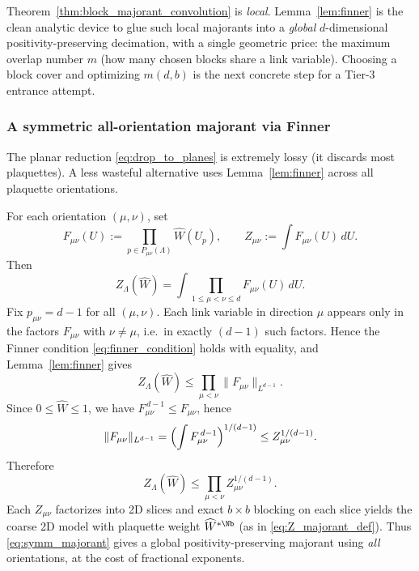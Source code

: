 \begin{remark}
Theorem~\ref{thm:block_majorant_convolution} is \emph{local}.
Lemma~\ref{lem:finner} is the clean analytic device to glue such local majorants into a \emph{global} $d$-dimensional positivity-preserving decimation, with a single geometric price: the maximum overlap number $m$ (how many chosen blocks share a link variable).
Choosing a block cover and optimizing $m(d,b)$ is the next concrete step for a Tier-3 entrance attempt.
\end{remark}

\subsubsection{A symmetric all-orientation majorant via Finner}\label{sec:symm_majorant}

The planar reduction \eqref{eq:drop_to_planes} is extremely lossy (it discards most plaquettes).
A less wasteful alternative uses Lemma~\ref{lem:finner} across all plaquette orientations.

For each orientation $(\mu,\nu)$, set
\[
F_{\mu\nu}(U):=\prod_{p\in P_{\mu\nu}(\Lambda)} \widehat W(U_p),
\qquad
Z_{\mu\nu}:=\int F_{\mu\nu}(U)\,dU.
\]
Then
\[
Z_\Lambda(\widehat W)=\int \prod_{1\le \mu<\nu\le d} F_{\mu\nu}(U)\,dU.
\]
Fix $p_{\mu\nu}=d-1$ for all $(\mu,\nu)$.
Each link variable in direction $\mu$ appears only in the factors $F_{\mu\nu}$ with $\nu\ne \mu$, i.e.\ in exactly $(d-1)$ such factors.
Hence the Finner condition \eqref{eq:finner_condition} holds with equality, and Lemma~\ref{lem:finner} gives
\begin{equation}\label{eq:symm_finner_step}
Z_\Lambda(\widehat W)\le \prod_{\mu<\nu}\|F_{\mu\nu}\|_{L^{d-1}}.
\end{equation}
Since $0\le \widehat W\le 1$, we have $F_{\mu\nu}^{\,d-1}\le F_{\mu\nu}$, hence
\[
\|F_{\mu\nu}\|_{L^{d-1}}
=\Bigl(\int F_{\mu\nu}^{\,d-1}\Bigr)^{1/(d-1)}
\le Z_{\mu\nu}^{1/(d-1)}.
\]
Therefore
\begin{equation}\label{eq:symm_majorant}
Z_\Lambda(\widehat W)
\le
\prod_{\mu<\nu} Z_{\mu\nu}^{1/(d-1)}.
\end{equation}
Each $Z_{\mu\nu}$ factorizes into 2D slices and exact $b\times b$ blocking on each slice yields the coarse 2D model with plaquette weight $\widehat W^{*\Nb}$ (as in \eqref{eq:Z_majorant_def}).
Thus \eqref{eq:symm_majorant} gives a global positivity-preserving majorant using \emph{all} orientations, at the cost of fractional exponents.

